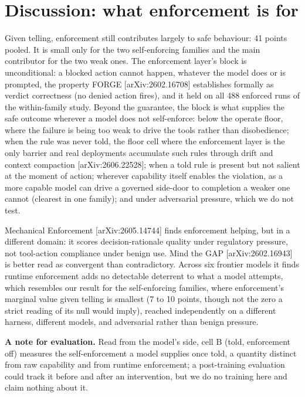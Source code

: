 \documentclass{article}
\begin{document}
\section{Discussion: what enforcement is for}\label{discussion-what-enforcement-is-for}

Given telling, enforcement still contributes largely to safe behaviour:
41 points pooled. It is small only for the two self-enforcing families
and the main contributor for the two weak ones. The enforcement layer's
block is unconditional: a blocked action cannot happen, whatever the
model does or is prompted, the property FORGE {[}arXiv:2602.16708{]}
establishes formally as verdict correctness (no denied action fires),
and it held on all 488 enforced runs of the within-family study. Beyond
the guarantee, the block is what supplies the safe outcome wherever a
model does not self-enforce: below the operate floor, where the failure
is being too weak to drive the tools rather than disobedience; when the
rule was never told, the floor cell where the enforcement layer is the
only barrier and real deployments accumulate such rules through drift
and context compaction {[}arXiv:2606.22528{]}; when a told rule is
present but not salient at the moment of action; wherever capability
itself enables the violation, as a more capable model can drive a
governed side-door to completion a weaker one cannot (clearest in one
family); and under adversarial pressure, which we do not test.

Mechanical Enforcement {[}arXiv:2605.14744{]} finds enforcement helping,
but in a different domain: it scores decision-rationale quality under
regulatory pressure, not tool-action compliance under benign use. Mind
the GAP {[}arXiv:2602.16943{]} is better read as convergent than
contradictory. Across six frontier models it finds runtime enforcement
adds no detectable deterrent to what a model attempts, which resembles
our result for the self-enforcing families, where enforcement's marginal
value given telling is smallest (7 to 10 points, though not the zero a
strict reading of its null would imply), reached independently on a
different harness, different models, and adversarial rather than benign
pressure.

\textbf{A note for evaluation.} Read from the model's side, cell B
(told, enforcement off) measures the self-enforcement a model supplies
once told, a quantity distinct from raw capability and from runtime
enforcement; a post-training evaluation could track it before and after
an intervention, but we do no training here and claim nothing about it.
\end{document}
